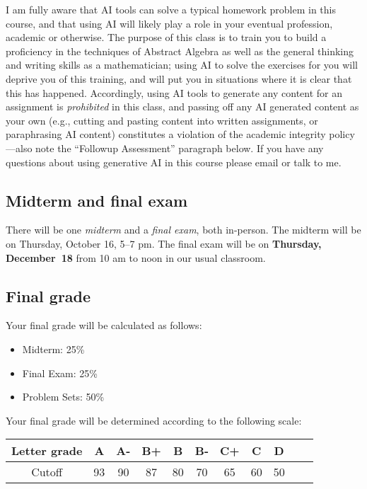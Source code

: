 \documentclass[12pt]{amsart}
\begin{document}
I am fully aware that AI tools can solve a typical homework problem in this course, and that using AI will likely play a role in your eventual profession, academic or otherwise. The purpose of this class is to train you to build a proficiency in the techniques of Abstract Algebra as well as the general thinking and writing skills as a mathematician; using AI to solve the exercises for you will deprive you of this training, and will put you in situations where it is clear that this has happened. Accordingly, using AI tools to generate any content for an assignment is {\it prohibited} in this class, and passing off any AI generated content as your own (e.g., cutting and pasting content into written assignments, or paraphrasing AI content) constitutes a violation of the academic integrity policy---also note the ``Followup Assessment'' paragraph below. If you have any questions about using generative AI in this course please email or talk to me.

\subsection*{Midterm and final exam} There will be one {\it midterm} and a {\it final exam}, both in-person. The midterm will be on Thursday, October 16, 5--7 pm.
The final exam will be on 
{\bf Thursday, December~18} from 10 am to noon in our usual classroom.



\subsection*{Final grade} Your final grade will be calculated as follows:

\begin{itemize}

	\item Midterm: 25\%
	\item Final Exam: 25\%
	\item Problem Sets: 50\%
\end{itemize}

\noindent
Your final grade will be determined according to the following scale:

\begin{center}
\hspace{2em}
\begin{minipage}{0.75\textwidth}
	\begin{tabular}{|c||c|c|c|c|c|c|c|c|c|c|}
	\hline
	Letter grade & A & A- & B+ & B & B- & C+ & C & D \\
	\hline
	Cutoff & 93 & 90 & 87 & 80 & 70 & 65 & 60 & 50 \\
	\hline
\end{tabular}
\end{minipage}
\end{center}
\end{document}

